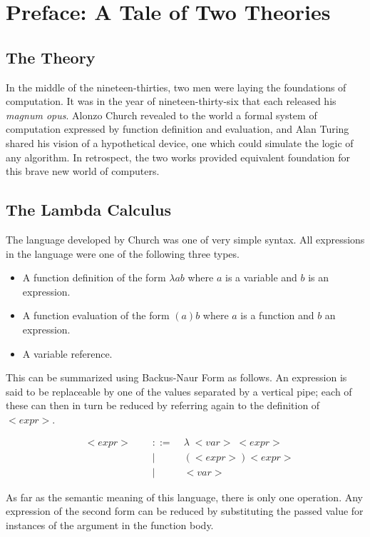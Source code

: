 
\chapter{Preface: A Tale of Two Theories}
\section{The Theory}
In the middle of the nineteen-thirties, two men were laying the foundations of 
computation. It was in the year of nineteen-thirty-six that each released his 
\emph{magnum opus}. Alonzo Church revealed to the world a formal system of computation 
expressed by function definition and evaluation, and Alan Turing shared his vision 
of a hypothetical device, one which could simulate the logic of any algorithm. In 
retrospect, the two works provided equivalent foundation for this brave new world 
of computers.

\section{The Lambda Calculus}
The language developed by Church was one of very simple syntax. All expressions in 
the language were one of the following three types.

\begin{itemize}
  \item A function definition of the form $\lambda a b$ where $a$ is a variable and $b$ is an expression.
  \item A function evaluation of the form $(a)b$ where $a$ is a function and $b$ an expression.
  \item A variable reference.
\end{itemize}

This can be summarized using Backus-Naur Form as follows. An expression is said to 
be replaceable by one of the values separated by a vertical pipe; each of these 
can then in turn be reduced by referring again to the definition of $<expr>$.

\begin{figure}[htp]
\caption{}\label{}
\begin{align*}
& <expr> \; &::= \; &\lambda \; <var> \; <expr>
\\& \qquad \qquad \qquad &| \; &(<expr>)<expr>
\\& \qquad \qquad \qquad &| \; &<var>
\end{align*}
\end{figure}

As far as the semantic meaning of this language, there is only one operation. Any 
expression of the second form can be reduced by substituting the passed value for 
instances of the argument in the function body.

